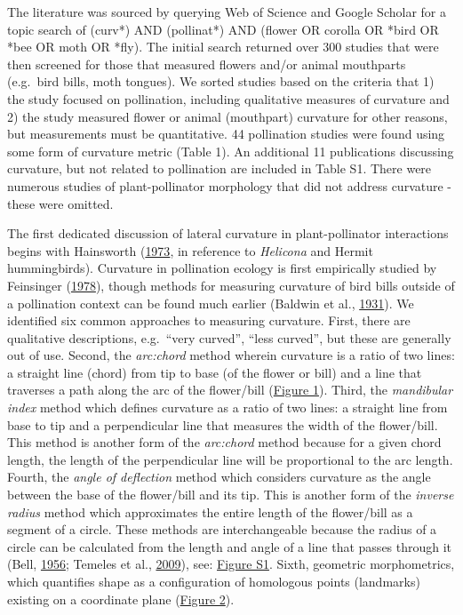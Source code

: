 \documentclass[]{article}
\begin{document}
The literature was sourced by querying Web of Science and Google Scholar
for a topic search of (curv*) AND (pollinat*) AND (flower OR corolla OR
*bird OR *bee OR moth OR *fly). The initial search returned over 300
studies that were then screened for those that measured flowers and/or
animal mouthparts (e.g.~bird bills, moth tongues). We sorted studies
based on the criteria that 1) the study focused on pollination,
including qualitative measures of curvature and 2) the study measured
flower or animal (mouthpart) curvature for other reasons, but
measurements must be quantitative. 44 pollination studies were found
using some form of curvature metric (Table 1). An additional 11
publications discussing curvature, but not related to pollination are
included in Table S1. There were numerous studies of plant-pollinator
morphology that did not address curvature - these were omitted.

The first dedicated discussion of lateral curvature in plant-pollinator
interactions begins with Hainsworth
(\protect\hyperlink{ref-hainsworth_1973}{1973}, in reference to
\emph{Helicona} and Hermit hummingbirds). Curvature in pollination
ecology is first empirically studied by Feinsinger
(\protect\hyperlink{ref-feinsinger_1978}{1978}), though methods for
measuring curvature of bird bills outside of a pollination context can
be found much earlier (Baldwin et al.,
\protect\hyperlink{ref-baldwin_1931}{1931}). We identified six common
approaches to measuring curvature. First, there are qualitative
descriptions, e.g.~``very curved'', ``less curved'', but these are
generally out of use. Second, the \emph{arc:chord} method wherein
curvature is a ratio of two lines: a straight line (chord) from tip to
base (of the flower or bill) and a line that traverses a path along the
arc of the flower/bill (\href{Figures/Figure_1.jpg}{Figure 1}). Third,
the \emph{mandibular index} method which defines curvature as a ratio of
two lines: a straight line from base to tip and a perpendicular line
that measures the width of the flower/bill. This method is another form
of the \emph{arc:chord} method because for a given chord length, the
length of the perpendicular line will be proportional to the arc length.
Fourth, the \emph{angle of deflection} method which considers curvature
as the angle between the base of the flower/bill and its tip. This is
another form of the \emph{inverse radius} method which approximates the
entire length of the flower/bill as a segment of a circle. These methods
are interchangeable because the radius of a circle can be calculated
from the length and angle of a line that passes through it (Bell,
\protect\hyperlink{ref-bell_1956}{1956}; Temeles et al.,
\protect\hyperlink{ref-temeles_2009}{2009}), see:
\href{Figures/Figure_S1.jpg}{Figure S1}. Sixth, geometric morphometrics,
which quantifies shape as a configuration of homologous points
(landmarks) existing on a coordinate plane
(\href{Figures/Figure_2.jpg}{Figure 2}).
\end{document}
